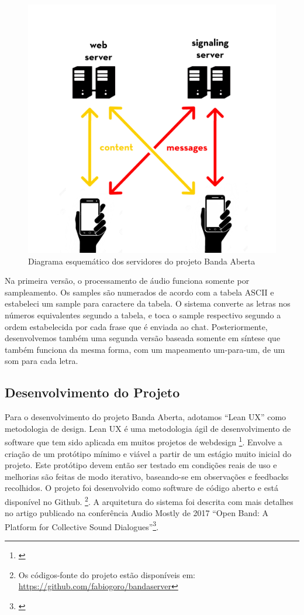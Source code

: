 \begin{figure}
    \caption{\label{bandaabertaserver}Diagrama esquemático dos servidores do projeto Banda Aberta}
    \begin{center}
        \includegraphics[width=0.5\linewidth]{pictures/server.jpg}
    \end{center}
\end{figure}

Na primeira versão, o processamento de áudio funciona somente por sampleamento. Os samples são numerados de acordo com a tabela ASCII e estabeleci um sample para caractere da tabela. O sistema converte as letras nos números equivalentes segundo a tabela, e toca o sample respectivo segundo a ordem estabelecida por cada frase que é enviada ao chat. Posteriormente, desenvolvemos também uma segunda versão baseada somente em síntese que também funciona da mesma forma, com um mapeamento um-para-um, de um som para cada letra.

\subsection{Desenvolvimento do Projeto}
Para o desenvolvimento do projeto Banda Aberta, adotamos ``Lean UX'' como metodologia de design. Lean UX é uma metodologia ágil de desenvolvimento de software que tem sido aplicada em muitos projetos de webdesign \footnote{\cite{leanux}}. Envolve a criação de um protótipo mínimo e viável a partir de um estágio muito inicial do projeto. Este protótipo devem então ser testado em condições reais de uso e melhorias são feitas de modo iterativo, baseando-se em observações e feedbacks recolhidos. O projeto foi desenvolvido como software de código aberto e está disponível no Github. \footnote{Os códigos-fonte do projeto estão disponíveis em: \url{https://github.com/fabiogoro/bandaserver}}. A arquitetura do sistema foi descrita com mais detalhes no artigo publicado na conferência Audio Mostly de 2017 ``Open Band: A Platform for Collective Sound Dialogues''\footnote{\cite{Stolfi2017}}.

